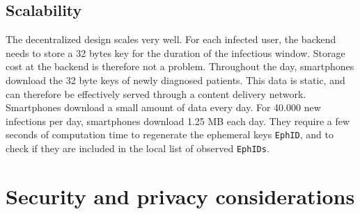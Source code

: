 \documentclass[12pt,a4paper]{article}
\begin{document}
\subsection*{Scalability}
The decentralized design scales very well. For each infected user, the backend needs to
store a 32 bytes key for the duration of the infectious window. Storage cost at the backend is therefore not a problem. Throughout the day, smartphones download the 32 byte keys of newly diagnosed patients. This data is static, and can therefore be effectively served through a content delivery network.\\[0.3cm]
Smartphones download a small amount of data every day. For 40.000 new infections per
day, smartphones download 1.25 MB each day. They require a few seconds of computation
time to regenerate the ephemeral keys \texttt{EphID}, and to check if they are included in the local list of observed \texttt{EphIDs}.
\clearpage
\section*{Security and privacy considerations}
\end{document}
